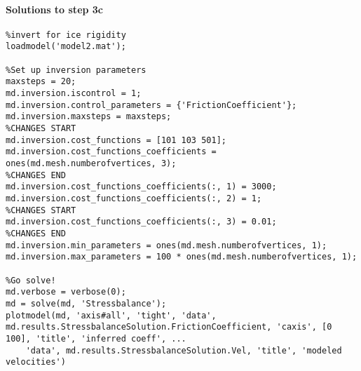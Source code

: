 \paragraph{Solutions to step 3c}
\begin{lstlisting}
%invert for ice rigidity
loadmodel('model2.mat');

%Set up inversion parameters
maxsteps = 20;
md.inversion.iscontrol = 1;
md.inversion.control_parameters = {'FrictionCoefficient'};
md.inversion.maxsteps = maxsteps;
%CHANGES START
md.inversion.cost_functions = [101 103 501];
md.inversion.cost_functions_coefficients = ones(md.mesh.numberofvertices, 3);
%CHANGES END
md.inversion.cost_functions_coefficients(:, 1) = 3000;
md.inversion.cost_functions_coefficients(:, 2) = 1;
%CHANGES START
md.inversion.cost_functions_coefficients(:, 3) = 0.01;
%CHANGES END
md.inversion.min_parameters = ones(md.mesh.numberofvertices, 1);
md.inversion.max_parameters = 100 * ones(md.mesh.numberofvertices, 1);

%Go solve!
md.verbose = verbose(0);
md = solve(md, 'Stressbalance');
plotmodel(md, 'axis#all', 'tight', 'data', md.results.StressbalanceSolution.FrictionCoefficient, 'caxis', [0 100], 'title', 'inferred coeff', ...
	'data', md.results.StressbalanceSolution.Vel, 'title', 'modeled velocities')
\end{lstlisting}

\clearpage %

